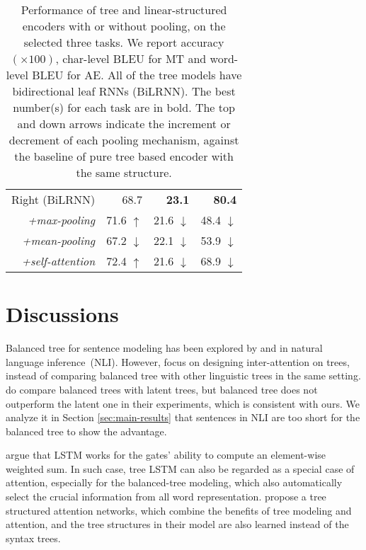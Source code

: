 \documentclass[11pt,a4paper]{article}
\begin{document}
\begin{table}[t]
\begin{tabular}{lrrr}
         \cmidrule(lr){2-4}
         Right (BiLRNN) & 68.7 & \textbf{23.1} & \textbf{80.4} \\
         \multicolumn{1}{r}{\textit{+max-pooling}}       & 71.6 $\uparrow$ &  21.6 $\downarrow$   &   48.4 $\downarrow$   \\
         \multicolumn{1}{r}{\textit{+mean-pooling}}      & 67.2 $\downarrow$   &  22.1 $\downarrow$   &   53.9 $\downarrow$   \\
         \multicolumn{1}{r}{\textit{+self-attention}}  & 72.4 $\uparrow$ & 21.6 $\downarrow$   & 68.9 $\downarrow$   \\
         \bottomrule
    \end{tabular} 
    \caption{\label{table:pooling} Performance of tree and linear-structured encoders with or without pooling, on the selected three tasks. We report accuracy $(\times 100)$, char-level BLEU for MT and word-level BLEU for AE. All of the tree models have bidirectional leaf RNNs (BiLRNN). The best number(s) for each task are in bold. The top and down arrows indicate the increment or decrement of each pooling mechanism, against the baseline of pure tree based encoder with the same structure.}
\end{table}

\section{Discussions}
\label{sec:related}

Balanced tree for sentence modeling has been explored by  and  in natural language inference~(NLI).
However,  focus on designing inter-attention on trees, instead of comparing balanced tree with other linguistic trees in the same setting.
 do compare balanced trees with latent trees, but balanced tree does not outperform the latent one in their experiments, which is consistent with ours.
We analyze it in Section \ref{sec:main-results} that sentences in NLI are too short for the balanced tree to show the advantage.


 argue that LSTM works for the gates’ ability to compute an element-wise weighted sum. In such case, tree LSTM can also be regarded as a special case of attention, especially for the balanced-tree modeling, which also automatically select the crucial information from all word representation.
 propose a tree structured attention networks, which combine the benefits of tree modeling and attention, and the tree structures in their model are also learned instead of the syntax trees. 
\end{document}

